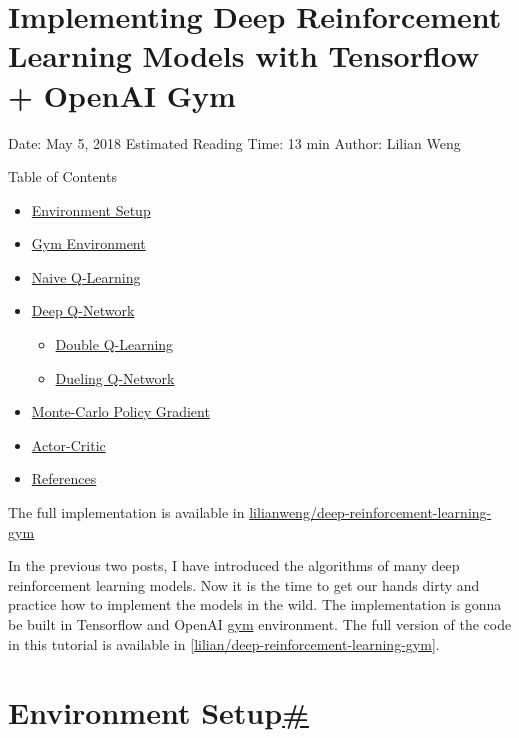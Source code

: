 \section{Implementing Deep Reinforcement Learning Models with Tensorflow + OpenAI Gym}\label{implementing-deep-reinforcement-learning-models-with-tensorflow-openai-gym}

Date: May 5, 2018 \textbar{} Estimated Reading Time: 13 min \textbar{} Author: Lilian Weng

{Table of Contents}

\begin{itemize}
\tightlist
\item
  \hyperref[environment-setup]{Environment Setup}
\item
  \hyperref[gym-environment]{Gym Environment}
\item
  \hyperref[naive-q-learning]{Naive Q-Learning}
\item
  \hyperref[deep-q-network]{Deep Q-Network}

  \begin{itemize}
  \tightlist
  \item
    \hyperref[double-q-learning]{Double Q-Learning}
  \item
    \hyperref[dueling-q-network]{Dueling Q-Network}
  \end{itemize}
\item
  \hyperref[monte-carlo-policy-gradient]{Monte-Carlo Policy Gradient}
\item
  \hyperref[actor-critic]{Actor-Critic}
\item
  \hyperref[references]{References}
\end{itemize}

The full implementation is available in \href{https://github.com/lilianweng/deep-reinforcement-learning-gym}{lilianweng/deep-reinforcement-learning-gym}

In the previous two posts, I have introduced the algorithms of many deep reinforcement learning models. Now it is the time to get our hands dirty and practice how to implement the models in the wild. The implementation is gonna be built in Tensorflow and OpenAI \href{https://github.com/openai/gym}{gym} environment. The full version of the code in this tutorial is available in \href{https://github.com/lilianweng/deep-reinforcement-learning-gym}{{[}lilian/deep-reinforcement-learning-gym{]}}.

\section{\texorpdfstring{Environment Setup\hyperref[environment-setup]{\#}}{Environment Setup\#}}\label{environment-setup}

